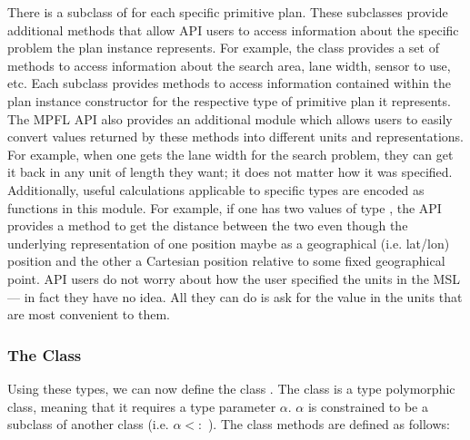 There is a subclass of  for each specific primitive plan. These subclasses provide additional methods that allow API users to access information about the specific problem the plan instance represents. For example, the class  provides a set of methods to access information about the search area, lane width, sensor to use, etc. Each subclass provides methods to access information contained within the plan instance constructor for the respective type of primitive plan it represents. The MPFL API also provides an additional module which allows users to easily convert values returned by these methods into different units and representations. For example, when one gets the lane width for the search problem, they can get it back in any unit of length they want; it does not matter how it was specified. Additionally, useful calculations applicable to specific types are encoded as functions in this module. For example, if one has two values of type , the API provides a method to get the distance between the two even though the underlying representation of one position maybe as a geographical (i.e. lat/lon) position and the other a Cartesian position relative to some fixed geographical point. API users do not worry about how the user specified the units in the MSL --- in fact they have no idea. All they can do is ask for the value in the units that are most convenient to them.

\subsubsection{The Class }
Using these types, we can now define the class . The class  is a type polymorphic class, meaning that it requires a type parameter $\alpha$. $\alpha$ is constrained to be a subclass of another class  (i.e. $\alpha <:$ ). The class methods are defined as follows:


